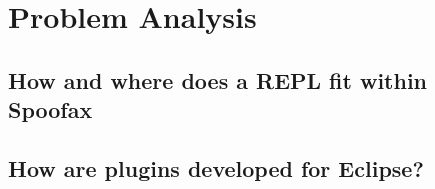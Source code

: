 \section{Problem Analysis}
\label{sec:problem-analysis}

\subsection{How and where does a REPL fit within Spoofax}
\label{ssec:architecture}

\subsection{How are plugins developed for Eclipse?}
\label{ssec:eclipse-plugins}

